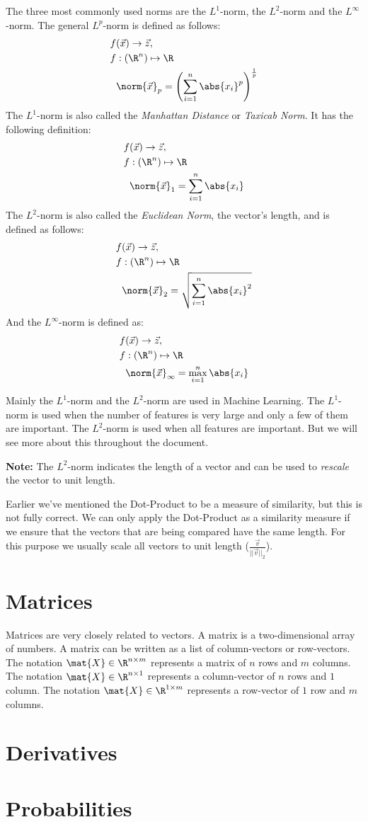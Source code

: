 The three most commonly used norms are the $L^1$-norm, the $L^2$-norm and the $L^{\infty}$-norm. The general $L^p$-norm is defined as follows:
\begin{align*}
  f&(\vec{x}) \rightarrow \vec{z},\\
  f&: (\R^n) \mapsto \R\\
  &\norm{\vec{x}}_p = \left(\sum_{i=1}^{n} \abs{x_i}^p\right)^{\frac{1}{p}}
  \end{align*}
The $L^1$-norm is also called the \textit{Manhattan Distance} or \textit{Taxicab Norm}. It has the following definition:
\begin{align*}
  f&(\vec{x}) \rightarrow \vec{z},\\
  f&: (\R^n) \mapsto \R\\
  &\norm{\vec{x}}_1 = \sum_{i=1}^{n} \abs{x_i}
\end{align*}
The $L^2$-norm is also called the \textit{Euclidean Norm}, the vector's length, and is defined as follows:
\begin{align*}
  f&(\vec{x}) \rightarrow \vec{z},\\
  f&: (\R^n) \mapsto \R\\
  &\norm{\vec{x}}_2 = \sqrt{\sum_{i=1}^{n} \abs{x_i}^2}
\end{align*}
And the $L^{\infty}$-norm is defined as:
\begin{align*}
  f&(\vec{x}) \rightarrow \vec{z},\\
  f&: (\R^n) \mapsto \R\\
  &\norm{\vec{x}}_{\infty} = \max_{i=1}^{n} \abs{x_i}
\end{align*}

Mainly the $L^1$-norm and the $L^2$-norm are used in Machine Learning. The $L^1$-norm is used when the number of features is very large and only a few of them are important. The $L^2$-norm is used when all features are important.
But we will see more about this throughout the document.

\textbf{Note:} The $L^2$-norm indicates the length of a vector and can be used to \textit{rescale} the vector to unit length.

Earlier we've mentioned the Dot-Product to be a measure of similarity, but this is not fully correct. We can only apply the Dot-Product as a similarity measure if we ensure that the vectors that are being compared have the same length. For this purpose we usually scale all vectors to unit length ($\frac{\vec{v}}{||\vec{v}||_2}$).

\section{Matrices}
Matrices are very closely related to vectors. A matrix is a two-dimensional array of numbers. A matrix can be written as a list of column-vectors or row-vectors. The notation $\mat{X} \in \R^{n \times m}$ represents a matrix of $n$ rows and $m$ columns. The notation $\mat{X} \in \R^{n \times 1}$ represents a column-vector of $n$ rows and $1$ column. The notation $\mat{X} \in \R^{1 \times m}$ represents a row-vector of $1$ row and $m$ columns.
\section{Derivatives}
\section{Probabilities}

\framedtext{\color{red}{TODO:}}

